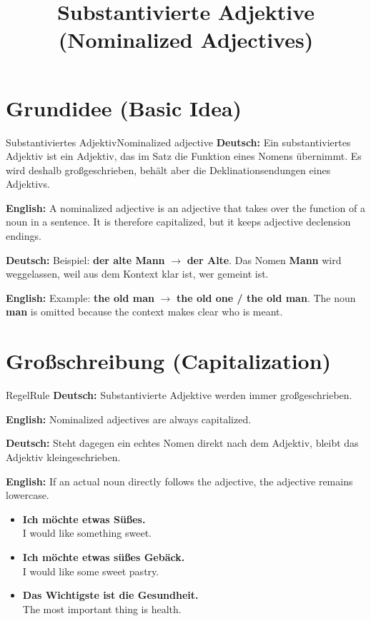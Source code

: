\documentclass[a4paper,11pt]{article}
\title{Substantivierte Adjektive\\\large \textnormal{(Nominalized Adjectives)}}
\date{}
\newcommand{\GermanText}[1]{\textbf{Deutsch: }#1\par}
\newcommand{\EnglishText}[1]{{\small\color{SoftGray}\textbf{English: }#1\par}}
\newcommand{\ExampleItem}[2]{\item \textbf{#1}\\{\small\color{SoftGray}#2}}
\begin{document}
\maketitle
\tableofcontents
\newpage

\section{Grundidee \textnormal{(Basic Idea)}}
\begin{grammarentry}{Substantiviertes Adjektiv}{Nominalized adjective}
\GermanText{Ein substantiviertes Adjektiv ist ein Adjektiv, das im Satz die Funktion eines Nomens übernimmt. Es wird deshalb großgeschrieben, behält aber die Deklinationsendungen eines Adjektivs.}
\EnglishText{A nominalized adjective is an adjective that takes over the function of a noun in a sentence. It is therefore capitalized, but it keeps adjective declension endings.}
\GermanText{Beispiel: \textbf{der alte Mann} $\rightarrow$ \textbf{der Alte}. Das Nomen \textbf{Mann} wird weggelassen, weil aus dem Kontext klar ist, wer gemeint ist.}
\EnglishText{Example: \textbf{the old man} $\rightarrow$ \textbf{the old one / the old man}. The noun \textbf{man} is omitted because the context makes clear who is meant.}
\end{grammarentry}

\section{Großschreibung \textnormal{(Capitalization)}}
\begin{grammarentry}{Regel}{Rule}
\GermanText{Substantivierte Adjektive werden immer großgeschrieben.}
\EnglishText{Nominalized adjectives are always capitalized.}
\GermanText{Steht dagegen ein echtes Nomen direkt nach dem Adjektiv, bleibt das Adjektiv kleingeschrieben.}
\EnglishText{If an actual noun directly follows the adjective, the adjective remains lowercase.}
\end{grammarentry}
\begin{exbox}
\begin{itemize}
\ExampleItem{Ich möchte etwas \textbf{Süßes}.}{I would like something sweet.}
\ExampleItem{Ich möchte etwas \textbf{süßes Gebäck}.}{I would like some sweet pastry.}
\ExampleItem{Das \textbf{Wichtigste} ist die Gesundheit.}{The most important thing is health.}
\end{itemize}
\end{exbox}
\end{document}
